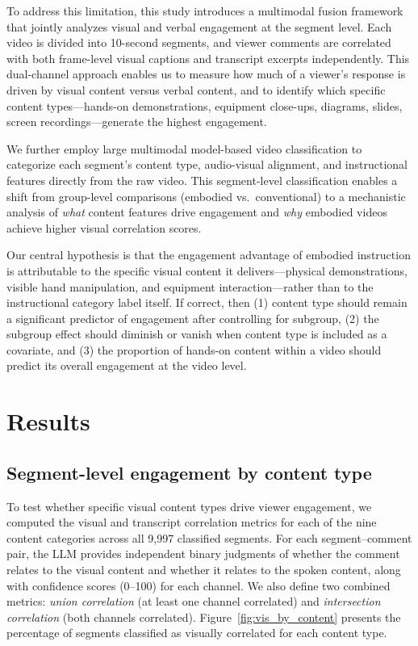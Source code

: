 \documentclass[fleqn,10pt]{wlscirep}
\begin{document}
To address this limitation, this study introduces a multimodal fusion framework that jointly analyzes visual and verbal engagement at the segment level. Each video is divided into 10-second segments, and viewer comments are correlated with both frame-level visual captions and transcript excerpts independently. This dual-channel approach enables us to measure how much of a viewer's response is driven by visual content versus verbal content, and to identify which specific content types---hands-on demonstrations, equipment close-ups, diagrams, slides, screen recordings---generate the highest engagement.

We further employ large multimodal model-based video classification to categorize each segment's content type, audio-visual alignment, and instructional features directly from the raw video. This segment-level classification enables a shift from group-level comparisons (embodied vs.\ conventional) to a mechanistic analysis of \emph{what} content features drive engagement and \emph{why} embodied videos achieve higher visual correlation scores.

Our central hypothesis is that the engagement advantage of embodied instruction is attributable to the specific visual content it delivers---physical demonstrations, visible hand manipulation, and equipment interaction---rather than to the instructional category label itself. If correct, then (1) content type should remain a significant predictor of engagement after controlling for subgroup, (2) the subgroup effect should diminish or vanish when content type is included as a covariate, and (3) the proportion of hands-on content within a video should predict its overall engagement at the video level.


\section*{Results}

\subsection*{Segment-level engagement by content type}

To test whether specific visual content types drive viewer engagement, we computed the visual and transcript correlation metrics for each of the nine content categories across all 9{,}997 classified segments. For each segment--comment pair, the LLM provides independent binary judgments of whether the comment relates to the visual content and whether it relates to the spoken content, along with confidence scores (0--100) for each channel. We also define two combined metrics: \emph{union correlation} (at least one channel correlated) and \emph{intersection correlation} (both channels correlated). Figure~\ref{fig:vis_by_content} presents the percentage of segments classified as visually correlated for each content type.
\end{document}
